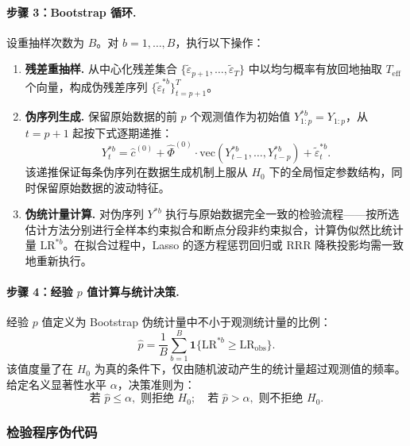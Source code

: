 \paragraph{步骤 3：Bootstrap 循环.}
设重抽样次数为 $B$。对 $b = 1, \ldots, B$，执行以下操作：

\begin{enumerate}
    \item \textbf{残差重抽样.} 从中心化残差集合 $\{\tilde{\varepsilon}_{p+1}, \ldots, \tilde{\varepsilon}_T\}$ 中以均匀概率有放回地抽取 $T_{\text{eff}}$ 个向量，构成伪残差序列 $\{\tilde{\varepsilon}_t^{*b}\}_{t=p+1}^{T}$。

    \item \textbf{伪序列生成.} 保留原始数据的前 $p$ 个观测值作为初始值 $Y_{1:p}^{*b} = Y_{1:p}$，从 $t = p+1$ 起按下式逐期递推：
    \begin{equation}\label{eq:bootstrap-recursion}
        Y_t^{*b} = \hat{c}^{(0)} + \hat{\Phi}^{(0)} \cdot \mathrm{vec}(Y_{t-1}^{*b}, \ldots, Y_{t-p}^{*b}) + \tilde{\varepsilon}_t^{*b}.
    \end{equation}
    该递推保证每条伪序列在数据生成机制上服从 $H_0$ 下的全局恒定参数结构，同时保留原始数据的波动特征。

    \item \textbf{伪统计量计算.} 对伪序列 $Y^{*b}$ 执行与原始数据完全一致的检验流程——按所选估计方法分别进行全样本约束拟合和断点分段非约束拟合，计算伪似然比统计量 $\mathrm{LR}^{*b}$。在拟合过程中，Lasso 的逐方程惩罚回归或 RRR 降秩投影均需一致地重新执行。
\end{enumerate}

\paragraph{步骤 4：经验 $p$ 值计算与统计决策.}
经验 $p$ 值定义为 Bootstrap 伪统计量中不小于观测统计量的比例：
\begin{equation}\label{eq:p-value}
    \hat{p} = \frac{1}{B} \sum_{b=1}^{B} \mathbf{1}\{\mathrm{LR}^{*b} \geq \mathrm{LR}_{\text{obs}}\}.
\end{equation}
该值度量了在 $H_0$ 为真的条件下，仅由随机波动产生的统计量超过观测值的频率。给定名义显著性水平 $\alpha$，决策准则为：
\begin{equation}\label{eq:decision}
    \text{若 } \hat{p} \leq \alpha, \text{ 则拒绝 } H_0; \quad \text{若 } \hat{p} > \alpha, \text{ 则不拒绝 } H_0.
\end{equation}

\subsubsection{检验程序伪代码}

